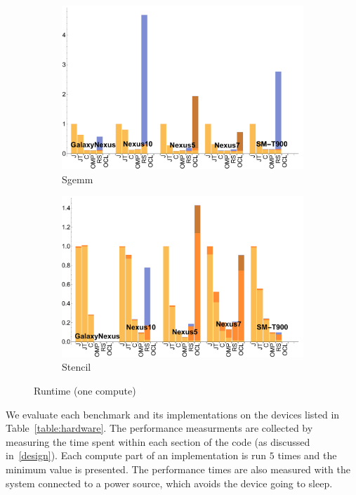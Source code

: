 \begin{figure}[ht]
  \begin{subfigure}[b]{0.5\textwidth}
      \centering
      \includegraphics[width=\textwidth]{data/Sgemm_onecompute_time.pdf}
      \caption{Sgemm}\label{fig:Sgemm}
  \end{subfigure}
  \begin{subfigure}[b]{0.5\textwidth}
      \centering
      \includegraphics[width=\textwidth]{data/Stencil_onecompute_time.pdf}
      \caption{Stencil}
      \label{fig:Stencil}
  \end{subfigure}

  \caption{Runtime (one compute)}
\end{figure}

We evaluate each benchmark and its implementations on the devices listed
  in Table~\ref{table:hardware}.
The performance measurments are collected by measuring the time
  spent within each section of the code (as discussed in~\ref{design}).
Each compute part of an implementation is run $5$ %
  times and the minimum value is presented.
The performance times are also measured with the system connected to a
  power source, which avoids the device going to sleep.

